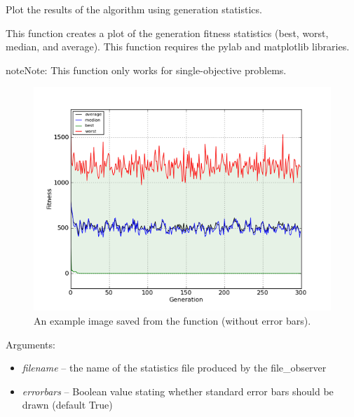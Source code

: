 \documentclass[letterpaper,10pt,english]{sphinxmanual}
\begin{document}
\begin{fulllineitems}
\label{reference:inspyred.ec.analysis.generation_plot}
Plot the results of the algorithm using generation statistics.

This function creates a plot of the generation fitness statistics 
(best, worst, median, and average). This function requires the 
pylab and matplotlib libraries.

\begin{notice}{note}{Note:}
This function only works for single-objective problems.
\end{notice}
\begin{figure}[htbp]
\centering
\capstart

\includegraphics{generation_plot.png}
\caption{An example image saved from the  function (without error bars).}\end{figure}

Arguments:
\begin{itemize}
\item {} 
\emph{filename} -- the name of the statistics file produced by the file\_observer

\item {} 
\emph{errorbars} -- Boolean value stating whether standard error bars should 
be drawn (default True)

\end{itemize}

\end{fulllineitems}
\end{document}
